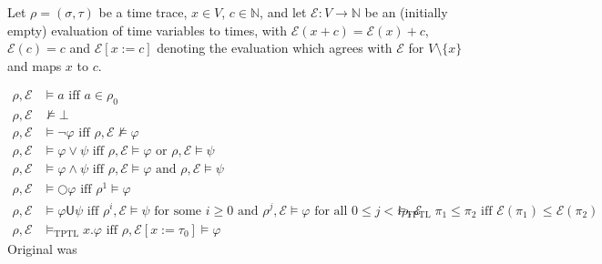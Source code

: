 \documentclass[a4paper]{article}
\newcommand{\U}{\mathsf{U}}
\newcommand{\tand}{\text{ and }}
\newcommand{\tor}{\text{ or }}
\newcommand{\tiff}{\text{ iff }}
\newcommand{\fsome}{\text{ for some }}
\newcommand{\fall}{\text{ for all }}
\newcommand{\eval}{\mathcal{E}}
\begin{document}
\begin{defn}\label{tptlsemfull}

  Let $\rho = (\sigma,\tau)$ be a time trace, $x\in V$, $c\in\mathbb{N}$, and let $\eval:V\to\mathbb{N}$ be an (initially empty) evaluation of time variables to times, with $\eval(x + c) = \eval(x) + c$, $\eval(c) = c$ and $\eval[x:=c]$ denoting the evaluation which agrees with $\eval$ for $V\setminus\{x\}$ and maps $x$ to $c$.

  \begin{align*}
    \rho,\eval&\vDash a \tiff a \in \rho_0\\
    \rho,\eval&\nvDash \bot\\
    \rho,\eval&\vDash \neg \varphi \tiff \rho,\eval \nvDash \varphi\\
    \rho,\eval&\vDash \varphi \lor \psi \tiff \rho,\eval \vDash \varphi \tor \rho,\eval \vDash \psi\\
    \rho,\eval&\vDash \varphi \land \psi \tiff \rho,\eval \vDash \varphi \tand \rho,\eval \vDash \psi\\
    \rho,\eval&\vDash \bigcirc \varphi \tiff \rho^1 \vDash \varphi\\
    \rho,\eval&\vDash \varphi \U \psi \tiff \rho^i,\eval \vDash \psi \fsome i \geq 0 \tand \rho^j,\eval \vDash \varphi \fall 0 \leq j < i
    \rho,\eval &\vDash_{\text{TPTL}}\pi_1\leq\pi_2 \tiff \eval(\pi_1)\leq\eval(\pi_2)\\
    \rho,\eval &\vDash_{\text{TPTL}} x.\varphi \tiff \rho,\eval[x:=\tau_0]\vDash\varphi
  \end{align*}
  Original was 
\end{defn}
\end{document}
